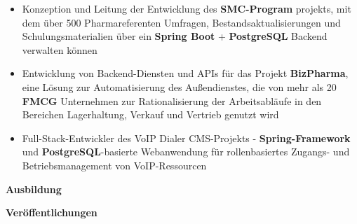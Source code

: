 \documentclass[10pt,a4paper,ragged2e,withhyper]{altacv}
\renewcommand{\cvsectionfont}{\Large\sffamily\bfseries}
\renewcommand{\divider}{\textcolor{PastelRed!50}{\hdashrule{1.015\linewidth}{0.6pt}{0.6ex}}\medskip}
\renewcommand{\cvsection}[2][]{%
  \nointerlineskip\bigskip%
  \ifstrequal{#1}{}{}{\marginpar{\vspace*{\dimexpr1pt-\baselineskip}\raggedright}}%
  {\color{heading}\cvsectionfont{#2}}\\[-1ex]%
  \makebox[0pt][l]{\color{headingrule}\rule{\dimexpr\linewidth+0.25cm}{1pt}}\par\medskip
}
\begin{document}
\begin{paracol}{2}
\vspace{0.75em}

\divider

\vspace{0.75em}

\begin{itemize}
\item \justifying Konzeption und Leitung der Entwicklung des \textbf{SMC-Program} projekts, mit dem über 500 Pharmareferenten Umfragen, Bestandsaktualisierungen und Schulungsmaterialien über ein \textbf{Spring Boot} + \textbf{PostgreSQL} Backend verwalten können
\item \justifying Entwicklung von Backend-Diensten und APIs für das Projekt \textbf{BizPharma}, eine Lösung zur Automatisierung des Außendienstes, die von mehr als 20 \textbf{FMCG} Unternehmen zur Rationalisierung der Arbeitsabläufe in den Bereichen Lagerhaltung, Verkauf und Vertrieb genutzt wird
\item \justifying Full-Stack-Entwickler des VoIP Dialer CMS-Projekts - \textbf{Spring-Framework} und \textbf{PostgreSQL}-basierte Webanwendung für rollenbasiertes Zugangs- und Betriebsmanagement von VoIP-Ressourcen
\end{itemize}

\vspace{2em}

\cvsection{Ausbildung}


\divider


\vspace{2em}

\cvsection{Veröffentlichungen}
\begin{justifying}
\nocite{saha2025pseudonymization}
\printbibliography[heading=none]
\end{justifying}

\end{paracol}
\end{document}
